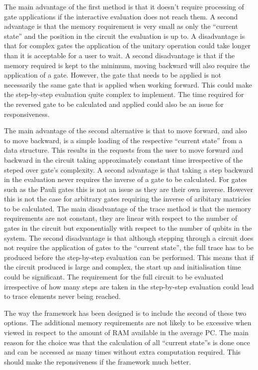The main advantage of the first method is that it doesn't require processing of gate applications if the interactive evaluation does not reach them.
A second advantage is that the memory requirement is very small as only the ``current state'' and the position in the circuit the evaluation is up to.
A disadvantage is that for complex gates the application of the unitary operation could take longer than it is acceptable for a user to wait.
A second disadvantage is that if the memory required is kept to the minimum, moving backward will also require the application of a gate.
However, the gate that needs to be applied is not necessarily the same gate that is applied when working forward.
This could make the step-by-step evaluation quite complex to implement.
The time required for the reversed gate to be calculated and applied could also be an issue for responsiveness.

The main advantage of the second alternative is that to move forward, and also to move backward, is a simple loading of the respective ``current state'' from a data structure.
This results in the requests from the user to move forward and backward in the circuit taking approximately constant time irrespective of the steped over gate's complexity.
A second advantage is that taking a step backward in the evaluation never requires the inverse of a gate to be calculated.
For gates such as the Pauli gates this is not an issue as they are their own inverse.
However this is not the case for arbitrary gates requiring the inverse of aribitary matricies to be calculated.
The main disadvantage of the trace method is that the memory requirements are not constant, they are linear with respect to the number of gates in the circuit but exponentially with respect to the number of qubits in the system.
The second disadvantage is that although stepping through a circuit does not require the application of gates to the ``current state'', the full trace has to be produced before the step-by-step evaluation can be performed.
This means that if the circuit produced is large and complex, the start up and initialisation time could be significant.
The requirement for the full circuit to be evaluated irrespective of how many steps are taken in the step-by-step evaluation could lead to trace elements never being reached.

The way the framework has been designed is to include the second of these two options.
The additional memory requirements are not likely to be excessive when viewed in respect to the amount of RAM available in the average PC.
The main reason for the choice was that the calculation of all ``current state''s is done once and can be accessed as many times without extra computation required.
This should make the reponsiveness if the framework much better.


